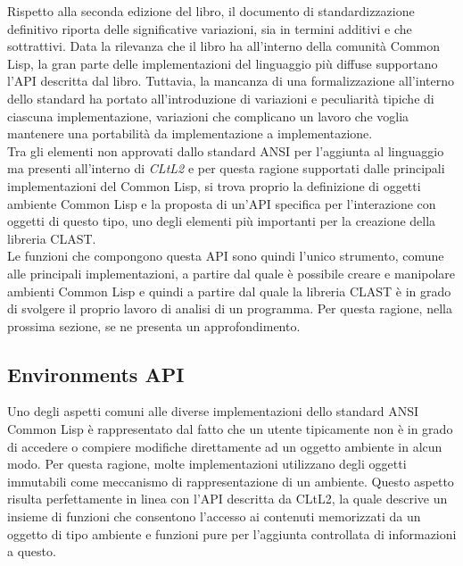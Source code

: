 Rispetto alla seconda edizione del libro, il documento di standardizzazione
definitivo riporta delle significative variazioni, sia in termini additivi e che
sottrattivi. Data la rilevanza che il libro ha all’interno della comunità Common
Lisp, la gran parte delle implementazioni del linguaggio più diffuse supportano
l’API descritta dal libro. Tuttavia, la mancanza di una formalizzazione
all’interno dello standard ha portato all’introduzione di variazioni e
peculiarità tipiche di ciascuna implementazione, variazioni che complicano un
lavoro che voglia mantenere una portabilità da implementazione a
implementazione.\\

Tra gli elementi non approvati dallo standard ANSI per l’aggiunta al linguaggio
ma presenti all’interno di \textit{CLtL2} e per questa ragione supportati dalle
principali implementazioni del Common Lisp, si trova proprio la definizione di
oggetti ambiente Common Lisp e la proposta di un'API specifica per l’interazione
con  oggetti di questo tipo, uno degli elementi più importanti per la creazione
della libreria CLAST.\\

Le funzioni che compongono questa API sono quindi l'unico strumento, comune alle
principali implementazioni, a partire dal quale è possibile creare e manipolare
ambienti Common Lisp e quindi a partire dal quale la libreria CLAST è in grado
di svolgere il proprio lavoro di analisi di un programma. Per questa ragione,
nella prossima sezione, se ne presenta un approfondimento.

\subsection{Environments API}

Uno degli aspetti comuni alle diverse implementazioni dello standard ANSI Common
Lisp è rappresentato dal fatto che un utente tipicamente non è in grado di
accedere o compiere modifiche direttamente ad un oggetto ambiente in alcun modo.
Per questa ragione, molte implementazioni utilizzano degli oggetti immutabili
come meccanismo di rappresentazione di un ambiente. Questo aspetto risulta
perfettamente in linea con l’API descritta da CLtL2, la quale descrive un
insieme di funzioni che consentono l’accesso ai contenuti memorizzati da un
oggetto di tipo ambiente e funzioni pure per l’aggiunta controllata di
informazioni a questo.\\

